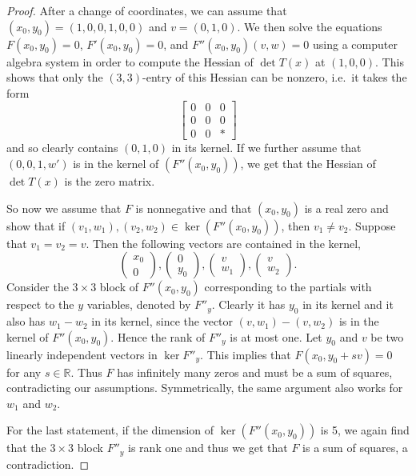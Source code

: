 \documentclass[a4paper]{article}
\numberwithin{equation}{section}
\newcommand{\R}{\mathbb{R}}
\theoremstyle{definition}
\theoremstyle{remark}
\begin{document}
\begin{proof}
After a change of coordinates, we can assume that $(x_0,y_0) = (1,0,0,1,0,0)$ and $v = (0,1,0)$.  
We then solve the equations $F(x_0,y_0) = 0$, $F'(x_0,y_0) = 0$, and $F''(x_0,y_0)(v,w) = 0$ using a computer algebra system in order to compute the Hessian of $\det T(x)$ at $(1,0,0)$. This shows that only the $(3,3)$-entry of this Hessian can be nonzero, i.e.~it takes the form
$$\begin{bmatrix}
0 & 0 & 0 \\
0 & 0 & 0 \\
0 & 0 & \ast
\end{bmatrix}$$
and so clearly contains $(0,1,0)$ in its kernel.
If we further assume that $(0,0,1,w')$ is in the kernel of $(F''(x_0,y_0))$, we get that the Hessian of $\det T(x)$ is the zero matrix.

So now we assume that $F$ is nonnegative and that $(x_0,y_0)$ is a real zero and show that if $(v_1,w_1), (v_2,w_2) \in \ker(F''(x_0,y_0))$, then $v_1 \neq v_2$.  
Suppose that $v_1 = v_2 = v$.  
Then the following vectors are contained in the kernel,
$$\begin{pmatrix}  x_0  \\ 0 \end{pmatrix},
\begin{pmatrix} 0 \\ y_0 \end{pmatrix},
\begin{pmatrix} v \\ w_1 \end{pmatrix},
\begin{pmatrix} v \\ w_2 \end{pmatrix}.$$
Consider the $3 \times 3$ block of $F''(x_0,y_0)$ corresponding to the partials with respect to the $y$ variables, denoted by $F''_y$.  
Clearly it has $y_0$ in its kernel and it also has $w_1-w_2$ in its kernel, since the vector $(v,w_1)-(v,w_2)$ is in the kernel of $F''(x_0,y_0)$.
Hence the rank of $F''_y$ is at most one.
Let $y_0$ and $v$ be two linearly independent vectors in $\ker F''_y$.
This implies that $F(x_0,y_0+sv) = 0$ for any $s \in \R$.  Thus $F$ has infinitely many zeros and must be a sum of squares, contradicting our assumptions. 
Symmetrically, the same argument also works for $w_1$ and $w_2$.

For the last statement, if the dimension of $\ker(F''(x_0,y_0))$ is 5, we again find that the $3 \times 3$ block $F''_y$ is rank one and thus we get that $F$ is a sum of squares, a contradiction. 
\end{proof}
\end{document}
